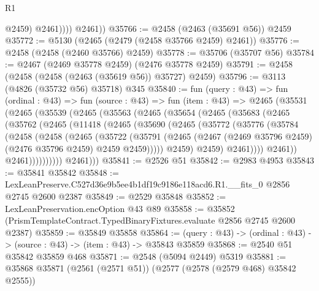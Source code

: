 \begin{lexlean}{R1}
\begin{coremodule}
                  @2459)
                @2461))))
        @2461))
@35766 := @2458 (@2463 (@35691 @56)) @2459
@35772 := @5130 (@2465 (@2479 (@2458 @35766 @2459) @2461))
@35776 := @2458 (@2458 (@2460 @35766) @2459)
@35778 := @35706 (@35707 @56)
@35784 := @2467 (@2469 @35778 @2459) (@2476 @35778 @2459)
@35791 := @2458 (@2458 (@2458 (@2463 (@35619 @56)) @35727) @2459)
@35796 := @3113 (@4826 (@35732 @56) @35718) @345
@35840 := fun (query : @43) =>
  fun (ordinal : @43) =>
  fun (source : @43) =>
  fun (item : @43) =>
  @2465
    (@35531
      (@2465
        (@35539
          (@2465
            (@35563
              (@2465
                (@35654
                  (@2465
                    (@35683
                      (@2465
                        (@35762
                          (@2465
                            (@11418
                              (@2465
                                (@35690
                                  (@2465
                                    (@35772
                                      (@35776
                                        (@35784
                                          (@2458
                                            (@2458
                                              (@2465
                                                (@35722
                                                  (@35791
                                                    (@2465
                                                      (@2467
                                                        (@2469 @35796 @2459)
                                                        (@2476 @35796 @2459)
                                                        @2459
                                                        @2459)))))
                                              @2459)
                                            @2459)
                                          @2461))))
                                  @2461))
                              @2461))))))))))
          @2461)))
@35841 := @2526 @51
@35842 := @2983 @4953
@35843 := @35841 @35842
@35848 := LexLeanPreserve.C527d36e9b5ee4b1df19c9186e118acd6.R1.__fits_0 @2856 @2745 @2600 @2387
@35849 := @2529 @35848
@35852 := LexLeanPreservation.encOption @43 @89
@35858 := @35852 (PrismTemplateContract.TypedBinaryFixtures.evaluate @2856 @2745 @2600 @2387)
@35859 := @35849 @35858
@35864 := (query : @43) -> (ordinal : @43) -> (source : @43) -> (item : @43) -> @35843 @35859
@35868 := @2540 @51 @35842 @35859 @468
@35871 := @2548 (@5094 @2449) @5319
@35881 := @35868 @35871 (@2561 (@2571 @51)) (@2577 (@2578 (@2579 @468) @35842 @2555))

\end{coremodule}
\end{lexlean}

